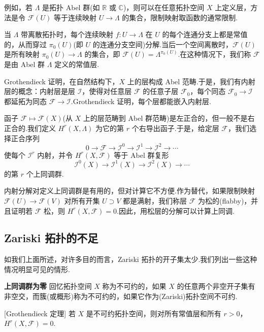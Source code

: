 例如，若 $\Lambda$ 是拓扑 Abel 群(如 $\mathbb{R}$ 或 $\mathbb{C}$)，则可以在任意拓扑空间 $X$ 上定义层，方法是令 $\mathcal{F}(U)$ 等于连续映射 $U \to \Lambda$ 的集合，限制映射取函数的通常限制.

当 $\Lambda$ 带离散拓扑时，每个连续映射 $f \colon U \to \Lambda$ 在 $U$ 的每个连通分支上都是常值的，从而穿过 $\pi_0(U)$(即 $U$ 的连通分支空间)分解.当后一个空间离散时，$\mathcal{F}(U)$ 是所有映射 $\pi_0(U) \to \Lambda$ 的集合，即 $\mathcal{F}(U) = \Lambda^{\pi_0(U)}$.在这种情况下，我们称 $\mathcal{F}$ 是由 Abel 群 $\Lambda$ 定义的常值层.

Grothendieck 证明，在自然结构下，$X$ 上的层构成 Abel 范畴.于是，我们有内射层的概念：内射层是层 $\mathcal{I}$，使得对任意层 $\mathcal{F}$ 的任意子层 $\mathcal{F}_0$，每个同态 $\mathcal{F}_0 \to \mathcal{I}$ 都延拓为同态 $\mathcal{F} \to \mathcal{I}$.Grothendieck 证明，每个层都能嵌入内射层.

函子 $\mathcal{F} \mapsto \mathcal{F}(X)$(从 $X$ 上的层范畴到 Abel 群范畴)是左正合的，但一般不是右正合的.我们定义 $H^{r}(X, \Lambda)$ 为它的第 $r$ 个右导出函子.于是，给定层 $\mathcal{F}$，我们选择正合序列
\[
0 \to \mathcal{F} \to \mathcal{I}^{0} \to \mathcal{I}^{1} \to \mathcal{I}^{2} \to \cdots
\]
使每个 $\mathcal{I}^{r}$ 内射，并令 $H^{r}(X, \mathcal{F})$ 等于 Abel 群复形
\[
\mathcal{I}^{0}(X) \to \mathcal{I}^{1}(X) \to \mathcal{I}^{2}(X) \to \cdots
\]
的第 $r$ 个上同调群.

内射分解对定义上同调群是有用的，但对计算它不方便.作为替代，如果限制映射 $\mathcal{F}(U) \to \mathcal{F}(V)$ 对所有开集 $U \supset V$ 都是满射，我们称层 $\mathcal{F}$ 为松的(flabby)，并且证明若 $\mathcal{F}$ 松，则 $H^{r}(X, \mathcal{F}) = 0$.因此，用松层的分解可以计算上同调.

\subsection*{Zariski 拓扑的不足}

如我们上面所述，对许多目的而言，Zariski 拓扑的开子集太少.我们列出一些这种情况明显可见的情形.

\textbf{上同调群为零} 回忆拓扑空间 $X$ 称为不可约的，如果 $X$ 的任意两个非空开子集有非空交，而簇(或概形)称为不可约的，如果它作为(Zariski)拓扑空间不可约.

\begin{theorem}\label{thm:1.1}[Grothendieck 定理]
若 $X$ 是不可约拓扑空间，则对所有常值层和所有 $r > 0$，$H^{r}(X, \mathcal{F}) = 0$.
\end{theorem}

